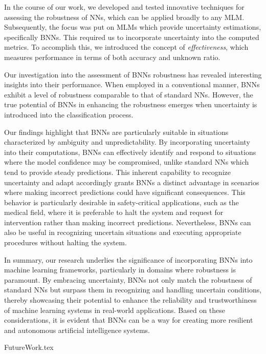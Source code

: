 \documentclass[
	12pt,
	a4paper,
	cleardoublepage=empty,
	headings=twolinechapter,
	numbers=autoenddot,
]{scrbook}
\begin{document}
	In the course of our work, we developed and tested innovative techniques for assessing the robustness of NNs, which can be applied broadly to any MLM. Subsequently, the focus was put on MLMs which provide uncertainty estimations, specifically BNNs. This required us to incorporate uncertainty into the computed metrics. To accomplish this, we introduced the concept of \textit{effectiveness}, which measures performance in terms of both accuracy and unknown ratio.
	
	Our investigation into the assessment of BNNs robustness has revealed interesting insights into their performance. When employed in a conventional manner, BNNs exhibit a level of robustness comparable to that of standard NNs. However, the true potential of BNNs in enhancing the robustness emerges when uncertainty is introduced into the classification process.
	
	Our findings highlight that BNNs are particularly suitable in situations characterized by ambiguity and unpredictability. By incorporating uncertainty into their computations, BNNs can effectively identify and respond to situations where the model confidence may be compromised, unlike standard NNs which tend to provide steady predictions. This inherent capability to recognize uncertainty and adapt accordingly grants BNNs a distinct advantage in scenarios where making incorrect predictions could have significant consequences. This behavior is particularly desirable in safety-critical applications, such as the medical field, where it is preferable to halt the system and request for intervention rather than making incorrect predictions. Nevertheless, BNNs can also be useful in recognizing uncertain situations and executing appropriate procedures without halting the system.
	
	In summary, our research underlies the significance of incorporating BNNs into machine learning frameworks, particularly in domains where robustness is paramount. By embracing uncertainty, BNNs not only match the robustness of standard NNs but surpass them in recognizing and handling uncertain conditions, thereby showcasing their potential to enhance the reliability and trustworthiness of machine learning systems in real-world applications. Based on these considerations, it is evident that BNNs can be a way for creating more resilient and autonomous artificial intelligence systems.
	
	{FutureWork.tex}
	
	
	
	
	
	
\end{document}
